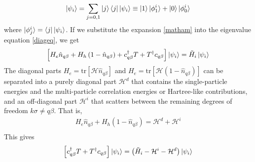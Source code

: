 \begin{equation}\begin{aligned}
	\label{matpsi}
\ket{\psi_i} = \sum_{j=0,1} \ket{j}\bra{j}\ket{\psi_i} \equiv \ket{1}\ket{\phi_1^i} + \ket{0}\ket{\phi_0^i}\end{aligned}\end{equation}
where \(\ket{\phi_j^i} = \bra{j}\ket{\psi_i}\). If we substitute the expansion \ref{matham} into the eigenvalue equation \ref{diageq}, we get
\begin{equation}\begin{aligned}
	\left[H_e \hat n_{q\beta} + H_h \left(1 - \hat n_{q\beta}\right) + c^\dagger_{q\beta}T + T^\dagger c_{q\beta}\right]\ket{\psi_i} = \tilde H_i\ket{\psi_i}
\end{aligned}\end{equation}
The diagonal parts \(H_e = \text{tr}\left[\mathcal{H} \hat n_{q\beta}\right]\) and \(H_e = \text{tr}\left[\mathcal{H} \left(1 - \hat n_{q\beta}\right)\right]\) can be separated into a purely diagonal part \(\mathcal{H}^d\) that contains the single-particle energies and the multi-particle correlation energies or Hartree-like contributions, and an off-diagonal part  \(\mathcal{H}^i\) that scatters between the remaining degrees of freedom \(k\sigma \neq q\beta\). That is,
\begin{equation*}
\begin{gathered}
	H_e \hat n_{q\beta} + H_h \left(1 - \hat n_{q\beta}\right) = \mathcal{H}^d + \mathcal{H}^i\\
\end{gathered}
\end{equation*}
This gives
\begin{equation}\begin{aligned}
	\left[c^\dagger_{q\beta}T + T^\dagger c_{q\beta}\right]\ket{\psi_i} = \left(\tilde H_i - \mathcal{H}^i - \mathcal{H}^d\right)\ket{\psi_i}
\end{aligned}\end{equation}
